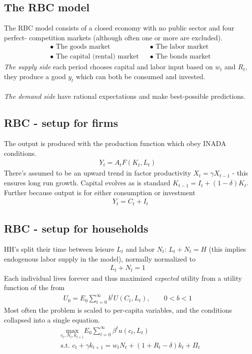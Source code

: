 \documentclass[12pt, a4paper]{article}
\begin{document}
\begin{spacing}{1.213}
\section{The RBC model}
The RBC model consists of a closed economy with no public sector and four perfect- competition markets (although often one or more are excluded).
\begin{align*}
& \bullet \textrm{ The goods market}
&& \bullet \textrm{ The labor market}
\\
& \bullet \textrm{ The capital (rental) market}
&& \bullet \textrm{ The bonds market}
\end{align*}
\textit{The supply side} each period chooses capital and labor input based on $w_t$ and $R_t$, they produce a good $y_t$ which can both be consumed and invested.
\\ \\
\textit{The demand side} have rational expectations and make best-possible predictions.

\subsection{RBC - setup for firms}
The output is produced with the production function which obey INADA conditions. 
\begin{align*}
Y_t = A_t F(K_t, L_t)
\end{align*}
There's assumed to be an upward trend in factor productivity $X_t = \gamma X_{t-1}$ - this ensures long run growth. Capital evolves as is standard $K_{t-1} = I_t + (1-\delta) K_t$. Further because output is for either consumption or investment
\begin{align*}
& Y_t = C_t + I_t
\end{align*}

\subsection{RBC - setup for households}
HH's split their time between leisure $L_t$ and labor $N_t$: $L_t + N_t = H$ (this implies endogenous labor supply in the model), normally normalized to
\begin{align*}
L_t + N_t = 1
\end{align*}
Each individual lives forever and thus maximized \textit{expected} utility from a utility function of the from
\begin{align*}
U_0 = E_0 \sum_{t=0}^{\infty} b^t U(C_t, L_t), \qquad 0<b<1
\end{align*}
Most often the problem is scaled to per-capita variables, and the conditions collapsed into a single equation.
\begin{align*}
&\underset{c_t, N_t, k_{t+1}}{\textrm{max}} E_0 \sum_{t=0}^{\infty} \beta^t u(c_t, L_t) \\
& \textrm{s.t. } c_t + \gamma k_{t+1} = w_t N_t + (1+R_t - \delta)k_t + \Pi_t
\end{align*}



\end{spacing}
\end{document}
